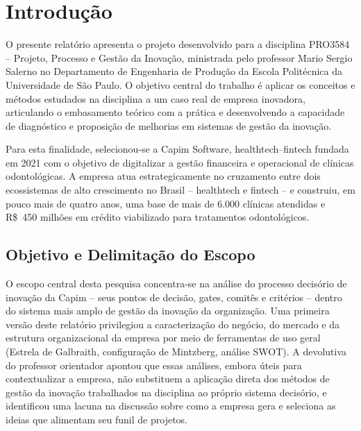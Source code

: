 
\chapter{Introdução}
\label{cap:introducao}

O presente relatório apresenta o projeto desenvolvido para a disciplina PRO3584 -- Projeto, Processo e Gestão da Inovação, ministrada pelo professor Mario Sergio Salerno no Departamento de Engenharia de Produção da Escola Politécnica da Universidade de São Paulo. O objetivo central do trabalho é aplicar os conceitos e métodos estudados na disciplina a um caso real de empresa inovadora, articulando o embasamento teórico com a prática e desenvolvendo a capacidade de diagnóstico e proposição de melhorias em sistemas de gestão da inovação.

Para esta finalidade, selecionou-se a Capim Software, healthtech--fintech fundada em 2021 com o objetivo de digitalizar a gestão financeira e operacional de clínicas odontológicas. A empresa atua estrategicamente no cruzamento entre dois ecossistemas de alto crescimento no Brasil -- healthtech e fintech -- e construiu, em pouco mais de quatro anos, uma base de mais de 6.000 clínicas atendidas e R\$~450 milhões em crédito viabilizado para tratamentos odontológicos.

\section{Objetivo e Delimitação do Escopo}

O escopo central desta pesquisa concentra-se na análise do processo decisório de inovação da Capim -- seus pontos de decisão, gates, comitês e critérios -- dentro do sistema mais amplo de gestão da inovação da organização. Uma primeira versão deste relatório privilegiou a caracterização do negócio, do mercado e da estrutura organizacional da empresa por meio de ferramentas de uso geral (Estrela de Galbraith, configuração de Mintzberg, análise SWOT). A devolutiva do professor orientador apontou que essas análises, embora úteis para contextualizar a empresa, não substituem a aplicação direta dos métodos de gestão da inovação trabalhados na disciplina ao próprio sistema decisório, e identificou uma lacuna na discussão sobre como a empresa gera e seleciona as ideias que alimentam seu funil de projetos.

